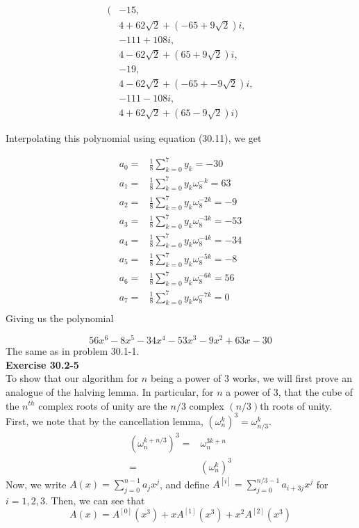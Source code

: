 \documentclass{article}
\begin{document}
 \begin{align*}
  (&-15,\\
  &4+62\sqrt{2}+ (-65+9\sqrt{2})i,\\
  &-111 + 108i,\\
  & 4-62\sqrt{2}+ (65+9\sqrt{2})i,\\
  & -19,\\
  &4-62\sqrt{2}+ (-65+-9\sqrt{2})i,\\
  &-111-108i,\\
  &4+62\sqrt{2}+ (65-9\sqrt{2})i)
  \end{align*}
  
    Interpolating this polynomial using equation (30.11), we get

\begin{align*}
a_0 =& \frac{1}{8} \sum_{k=0}^{7} y_k = -30\\
a_1 =& \frac{1}{8} \sum_{k=0}^{7} y_k \omega_8^{-k} = 63\\
a_2 =& \frac{1}{8} \sum_{k=0}^{7} y_k \omega_8^{-2k} = -9\\
a_3 =& \frac{1}{8} \sum_{k=0}^{7} y_k \omega_8^{-3k} = -53\\
a_4 =& \frac{1}{8} \sum_{k=0}^{7} y_k \omega_8^{-4k} = -34\\
a_5 =& \frac{1}{8} \sum_{k=0}^{7} y_k \omega_8^{-5k} = -8\\
a_6 =& \frac{1}{8} \sum_{k=0}^{7} y_k \omega_8^{-6k} = 56\\
a_7 =& \frac{1}{8} \sum_{k=0}^{7} y_k \omega_8^{-7k} = 0\\
\end{align*}
Giving us the polynomial

\[
56x^6 -8x^5-34x^4-53x^3-9x^2+63x-30
\]
The same as in problem 30.1-1.\\

\noindent\textbf{Exercise 30.2-5}\\
To show that our algorithm for $n$ being a power of $3$ works, we will first prove an analogue of the halving lemma. In particular, for $n$ a power of 3, that the cube of the $n^{th}$ complex roots of unity are the $n/3$ complex $(n/3)$th roots of unity. First, we note that by the cancellation lemma, $(\omega_{n}^k)^3 = \omega_{n/3}^k$. 
\begin{align*}
(\omega_n^{k+n/3})^3 =& \omega_n^{3k+n}\\
=&(\omega_n^k)^3
\end{align*}
Now, we write $A(x) = \sum_{j=0}^{n-1} a_jx^j$, and define $A^{[i]} = \sum_{j=0}^{n/3-1}a_{i+3j}x^j$ for $i=1,2,3$. Then, we can see that \[A(x) = A^{[0]}(x^3) + x A^{[1]}(x^3) + x^2 A^{[2]}(x^3)\]
\end{document}
